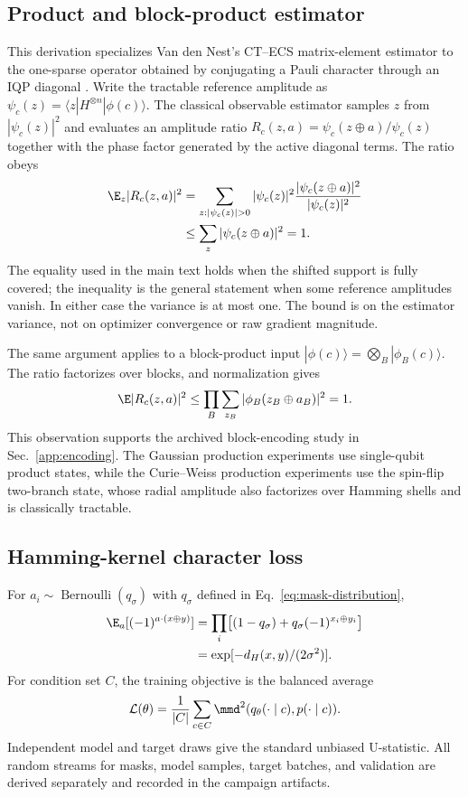 \subsection{Product and block-product estimator}

This derivation specializes Van den Nest's CT--ECS matrix-element estimator to
the one-sparse operator obtained by conjugating a Pauli character through an
IQP diagonal \cite[Definition~1 and Theorems~1 and~3]{nestSimulatingQuantumComputers2011}.
Write the tractable reference amplitude as
$\psi_c(z)=\langle z|H^{\otimes n}|\phi(c)\rangle$. The classical
observable estimator samples $z$ from $|\psi_c(z)|^2$ and evaluates an
amplitude ratio $R_c(z,a)=\psi_c(z\oplus a)/\psi_c(z)$ together with the
phase factor generated by the active diagonal terms. The ratio obeys
\begin{align}
 \E_z|R_c(z,a)|^2
 &=\sum_{z:|\psi_c(z)|>0}|\psi_c(z)|^2
   \frac{|\psi_c(z\oplus a)|^2}{|\psi_c(z)|^2} \\
 &\leq \sum_z|\psi_c(z\oplus a)|^2=1.
\end{align}
The equality used in the main text holds when the shifted support is fully
covered; the inequality is the general statement when some reference
amplitudes vanish. In either case the variance is at most one. The bound is on
the estimator variance, not on optimizer convergence or raw gradient
magnitude.

The same argument applies to a block-product input
$|\phi(c)\rangle=\bigotimes_B|\phi_B(c)\rangle$. The ratio factorizes over
blocks, and normalization gives
\begin{equation}
 \E|R_c(z,a)|^2
 \leq\prod_B\sum_{z_B}|\phi_B(z_B\oplus a_B)|^2=1.
\end{equation}
This observation supports the archived block-encoding study in
Sec.~\ref{app:encoding}. The Gaussian production experiments use single-qubit
product states, while the Curie--Weiss production experiments use the
spin-flip two-branch state, whose radial amplitude also factorizes over
Hamming shells and is classically tractable.

\subsection{Hamming-kernel character loss}

For $a_i\sim\operatorname{Bernoulli}(q_\sigma)$ with $q_\sigma$ defined in
Eq.~\eqref{eq:mask-distribution},
\begin{align}
 \E_a[(-1)^{a\cdot(x\oplus y)}]
 &=\prod_i\bigl[(1-q_\sigma)+q_\sigma(-1)^{x_i\oplus y_i}\bigr]\\
 &=\exp[-d_H(x,y)/(2\sigma^2)].
\end{align}
For condition set $C$, the training objective is the balanced average
\begin{equation}
 \mathcal L(\theta)=\frac{1}{|C|}\sum_{c\in C}
 \mmd^2(q_\theta(\cdot\mid c),p(\cdot\mid c)).
\end{equation}
Independent model and target draws give the standard unbiased U-statistic.
All random streams for masks, model samples, target batches, and validation
are derived separately and recorded in the campaign artifacts.

